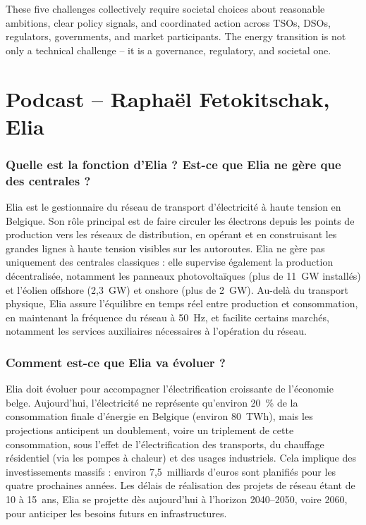 These five challenges collectively require societal choices about reasonable ambitions, clear policy signals, and coordinated action across TSOs, DSOs, regulators, governments, and market participants. The energy transition is not only a technical challenge -- it is a governance, regulatory, and societal one.

\section{Podcast -- Raphaël Fetokitschak, Elia}

\subsubsection{Quelle est la fonction d'Elia ? Est-ce que Elia ne gère que des centrales ?}

Elia est le gestionnaire du réseau de transport d'électricité à haute tension en Belgique. Son rôle principal est de faire circuler les électrons depuis les points de production vers les réseaux de distribution, en opérant et en construisant les grandes lignes à haute tension visibles sur les autoroutes. Elia ne gère pas uniquement des centrales classiques : elle supervise également la production décentralisée, notamment les panneaux photovoltaïques (plus de 11~GW installés) et l'éolien offshore (2,3~GW) et onshore (plus de 2~GW). Au-delà du transport physique, Elia assure l'équilibre en temps réel entre production et consommation, en maintenant la fréquence du réseau à 50~Hz, et facilite certains marchés, notamment les services auxiliaires nécessaires à l'opération du réseau.

\subsubsection{Comment est-ce que Elia va évoluer ?}

Elia doit évoluer pour accompagner l'électrification croissante de l'économie belge. Aujourd'hui, l'électricité ne représente qu'environ 20~\% de la consommation finale d'énergie en Belgique (environ 80~TWh), mais les projections anticipent un doublement, voire un triplement de cette consommation, sous l'effet de l'électrification des transports, du chauffage résidentiel (via les pompes à chaleur) et des usages industriels. Cela implique des investissements massifs : environ 7,5~milliards d'euros sont planifiés pour les quatre prochaines années. Les délais de réalisation des projets de réseau étant de 10 à 15~ans, Elia se projette dès aujourd'hui à l'horizon 2040--2050, voire 2060, pour anticiper les besoins futurs en infrastructures.

